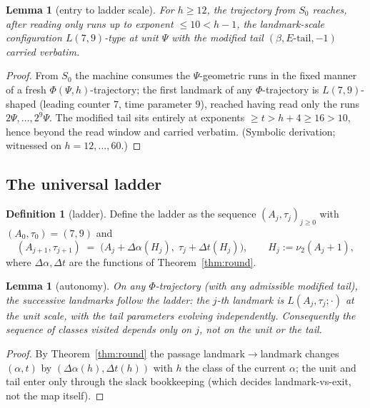 \documentclass[11pt]{amsart}
\newtheorem{lemma}[theorem]{Lemma}
\theoremstyle{definition}
\newtheorem{definition}[theorem]{Definition}
\newcommand{\vtwo}[1]{\nu_2(#1)}
\begin{document}
\begin{lemma}[entry to ladder scale]\label{lem:entryladder}
For $h\ge12$, the trajectory from $S_0$ reaches, after reading only runs up
to exponent $\le10<h-1$, the landmark-scale configuration
$L(7,9)$-type at unit $\Psi$ with the modified tail
$(\beta,E\text{-tail},-1)$ carried verbatim.
\end{lemma}

\begin{proof}
From $S_0$ the machine consumes the $\Psi$-geometric runs in the fixed
manner of a fresh $\Phi(\Psi,h)$-trajectory; the first landmark of any
$\Phi$-trajectory is $L(7,9)$-shaped (leading counter $7$, time parameter
$9$), reached having read only the runs $2\Psi,\dots,2^{9}\Psi$. The
modified tail sits entirely at exponents $\ge t>h+4\ge16>10$, hence beyond
the read window and carried verbatim. (Symbolic derivation; witnessed on
$h=12,\dots,60$.)
\end{proof}

\subsection{The universal ladder}\label{s:ladder}

\begin{definition}[ladder]\label{def:ladder}
Define the ladder as the sequence $(A_j,\tau_j)_{j\ge0}$ with
$(A_0,\tau_0)=(7,9)$ and
\[
(A_{j+1},\tau_{j+1}) \;=\; \bigl(A_j+\Delta\alpha(H_j),\;\tau_j+\Delta t(H_j)\bigr),
\qquad H_j:=\vtwo{A_j+1},
\]
where $\Delta\alpha,\Delta t$ are the functions of Theorem~\ref{thm:round}.
\end{definition}

\begin{lemma}[autonomy]\label{lem:autonomy}
On any $\Phi$-trajectory (with any admissible modified tail), the
successive landmarks follow the ladder: the $j$-th landmark is
$L(A_j,\tau_j;\cdot)$ at the unit scale, with the tail parameters evolving
independently. Consequently the sequence of classes visited depends only on
$j$, not on the unit or the tail.
\end{lemma}

\begin{proof}
By Theorem~\ref{thm:round} the passage landmark$\to$landmark changes
$(\alpha,t)$ by $(\Delta\alpha(h),\Delta t(h))$ with $h$ the class of the
current $\alpha$; the unit and tail enter only through the slack bookkeeping
(which decides landmark-vs-exit, not the map itself).
\end{proof}
\end{document}
